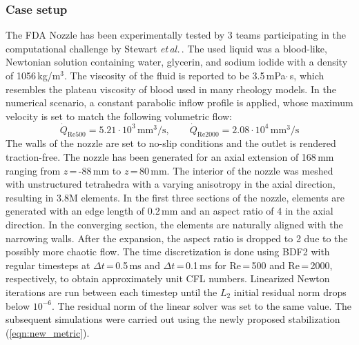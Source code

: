 \subsubsection*{Case setup}
The FDA Nozzle has been experimentally tested by 3 teams participating in the computational challenge by Stewart \textit{et\,al.}\,\cite{Stewart2012}. The used liquid was a blood-like, Newtonian solution containing water, glycerin, and sodium iodide with a density of 1056\,kg/m$^3$. The viscosity of the fluid is reported to be 3.5\,mPa$\cdot$\,s, which resembles the plateau viscosity of blood used in many rheology models. In the numerical scenario, a constant parabolic inflow profile is applied, whose maximum velocity is set to match the following volumetric flow:
\begin{equation*}
	\dot{Q}_{\text{Re}500} = 5.21\cdot10^{3}\,\text{mm}^3/\text{s},\qquad \dot{Q}_{\text{Re}2000} = 2.08\cdot10^{4}\,\text{mm}^3/\text{s}
\end{equation*}
The walls of the nozzle are set to no-slip conditions and the outlet is rendered traction-free. The nozzle has been generated for an axial extension of 168\,mm ranging from $z$\,=\,-88\,mm to $z$\,=\,80\,mm. The interior of the nozzle was meshed with unstructured tetrahedra with a varying anisotropy in the axial direction, resulting in 3.8M elements. In the first three sections of the nozzle, elements are generated with an edge length of 0.2\,mm and an aspect ratio of 4 in the axial direction. In the converging section, the elements are naturally aligned with the narrowing walls. After the expansion, the aspect ratio is dropped to 2 due to the possibly more chaotic flow. The time discretization is done using BDF2 with regular timesteps at $\Delta t$\,=\,0.5\,ms and $\Delta t$\,=\,0.1\,ms for Re\,=\,500 and Re\,=\,2000, respectively, to obtain approximately unit CFL numbers. Linearized Newton iterations are run between each timestep until the $L_2$ initial residual norm drops below $10^{-6}$. The residual norm of the linear solver was set to the same value. The subsequent simulations were carried out using the newly proposed stabilization (\autoref{eqn:new_metric}).

